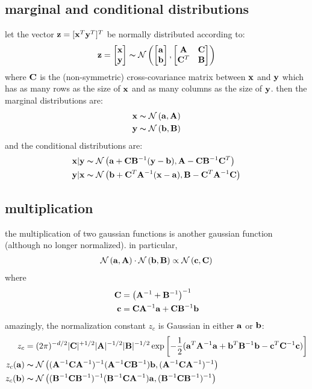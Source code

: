 \documentclass[12pt]{article}
\begin{document}
\subsection{marginal and conditional distributions}
let the vector $\zz=[\xx^T \yy^T]^T$ be normally distributed according
to:
\begin{align}
\zz  = \begin{bmatrix}\xx \\ \yy \end{bmatrix}
\distrib \normal{\begin{bmatrix}\aaa \\ \bb \end{bmatrix}}
{\begin{bmatrix}\AA & \CC \\ \CC^T & \BB \end{bmatrix}}
\end{align}
where $\CC$ is the (non-symmetric)
cross-covariance matrix between $\xx$ and $\yy$ which has as
many rows as the size of $\xx$ and as many columns as the size of
 $\yy$. then the marginal distributions are:
\begin{align}
\xx &\distrib \normal{\aaa}{\AA} \\
\yy &\distrib \normal{\bb}{\BB}
\end{align}
and the conditional distributions are:
\begin{align}
\xx | \yy &\distrib \normal{\aaa + \CC\BB^{-1}(\yy-\bb)}
{\AA - \CC\BB^{-1}\CC^T} \\
\yy | \xx &\distrib \normal{\bb + \CC^T\AA^{-1}(\xx-\aaa)}
{\BB - \CC^T\AA^{-1}\CC}
\end{align}

\subsection{multiplication}
the multiplication of two gaussian functions is another gaussian
function (although no longer normalized). in particular,
\begin{align}
\normal{\aaa}{\AA} \cdot \normal{\bb}{\BB} \propto \normal{\cc}{\CC}
\end{align} 
where
\begin{align}
\CC &= \left( \AA^{-1}+\BB^{-1} \right)^{-1}\\
\cc &= \CC\AA^{-1}\aaa + \CC\BB^{-1}\bb
\end{align}
amazingly, the normalization constant $z_c$ is Gaussian in either
$\aaa$ or $\bb$:
\begin{align}
z_c &= (2\pi)^{-d/2}|\CC|^{+1/2}|\AA|^{-1/2}|\BB|^{-1/2}
\exp \left[ -\frac{1}{2}( \aaa^T\AA^{-1}\aaa + \bb^T\BB^{-1}\bb 
- \cc^T\CC^{-1}\cc ) \right]\\
z_c(\aaa) &\distrib \normal{(\AA^{-1}\CC\AA^{-1})^{-1}
(\AA^{-1}\CC\BB^{-1})\bb}
{(\AA^{-1}\CC\AA^{-1})^{-1}}\\
z_c(\bb) &\distrib \normal{(\BB^{-1}\CC\BB^{-1})^{-1}
(\BB^{-1}\CC\AA^{-1})\aaa}
{(\BB^{-1}\CC\BB^{-1})^{-1}}
\end{align}
\end{document}
